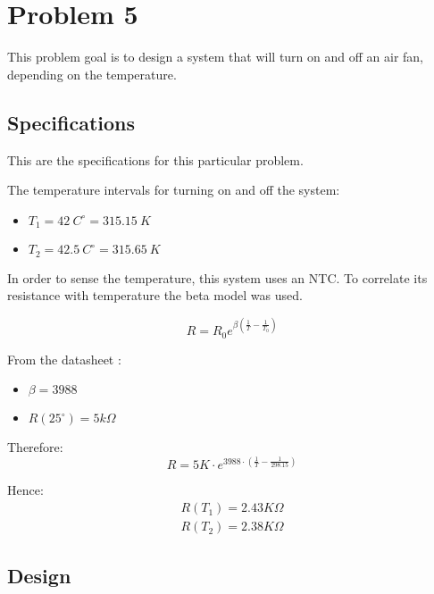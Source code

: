 \section{Problem 5}

This problem goal is to design a system that will turn on and off an air fan, depending on the temperature.

\subsection{Specifications}

This are the specifications for this particular problem.

The temperature intervals for turning on and off the system:
\begin{itemize}
        
    \item $T_1 = 42~C^\circ   =  315.15 ~K$
    \item $T_2 = 42.5~C^\circ =  315.65 ~K$

\end{itemize}

In order to sense the temperature, this system uses an NTC. To correlate its resistance with temperature the beta model was used. 

\begin{equation}
    R = R_0 e^{\beta\left ( \frac{1}{T} - \frac{1}{T_0 } \right )}
\end{equation}

From the datasheet \textsuperscript{\cite{NTC_datasheet}} :

\begin{itemize}
    \item $\beta = 3988$
    \item $R(25^{\circ}) = 5k\Omega$ 
\end{itemize}

Therefore: 
\begin{equation}
    R = 5K\cdot e^{ 3988\cdot \left ( \frac{1}{T} - \frac{1}{298.15 } \right )}
\end{equation}

Hence: 
\begin{equation}
    \begin{aligned}   
        R(T_1) = 2.43 K\Omega\\
        R(T_2) = 2.38 K\Omega
    \end{aligned}
\end{equation}

\subsection{Design}
